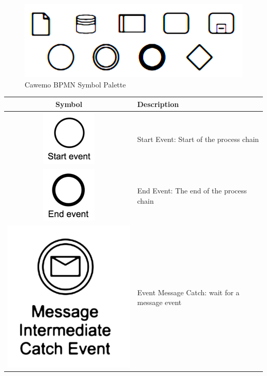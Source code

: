 \documentclass[]{book}
\begin{document}
\begin{figure}
\centering
\includegraphics{images/cawemopalette.png}
\caption{Cawemo BPMN Symbol Palette}
\end{figure}

\begin{longtable}[]{@{}cl@{}}
\toprule
Symbol & Description\tabularnewline
\midrule
\endhead
\includegraphics{images/start-event.png} & Start Event: Start of the process chain\tabularnewline
\includegraphics{images/end-event.png} & End Event: The end of the process chain\tabularnewline
\includegraphics{images/event-message-catch.png} & Event Message Catch: wait for a message event\tabularnewline

\end{longtable}
\end{document}
